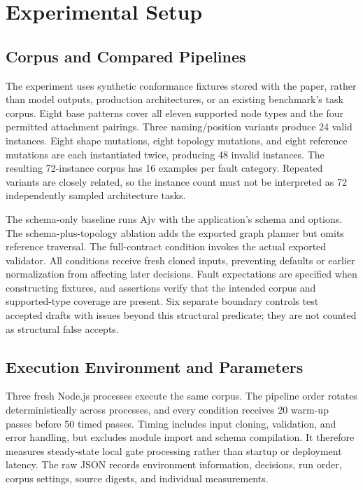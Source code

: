 \section{Experimental Setup}
\subsection{Corpus and Compared Pipelines}
The experiment uses synthetic conformance fixtures stored with the paper, rather than model outputs, production architectures, or an existing benchmark's task corpus. Eight base patterns cover all eleven supported node types and the four permitted attachment pairings. Three naming/position variants produce 24 valid instances. Eight shape mutations, eight topology mutations, and eight reference mutations are each instantiated twice, producing 48 invalid instances. The resulting 72-instance corpus has 16 examples per fault category. Repeated variants are closely related, so the instance count must not be interpreted as 72 independently sampled architecture tasks.

The schema-only baseline runs Ajv with the application's schema and options. The schema-plus-topology ablation adds the exported graph planner but omits reference traversal. The full-contract condition invokes the actual exported validator. All conditions receive fresh cloned inputs, preventing defaults or earlier normalization from affecting later decisions. Fault expectations are specified when constructing fixtures, and assertions verify that the intended corpus and supported-type coverage are present. Six separate boundary controls test accepted drafts with issues beyond this structural predicate; they are not counted as structural false accepts.

\subsection{Execution Environment and Parameters}
Three fresh Node.js processes execute the same corpus. The pipeline order rotates deterministically across processes, and every condition receives 20 warm-up passes before 50 timed passes. Timing includes input cloning, validation, and error handling, but excludes module import and schema compilation. It therefore measures steady-state local gate processing rather than startup or deployment latency. The raw JSON records environment information, decisions, run order, corpus settings, source digests, and individual measurements.

